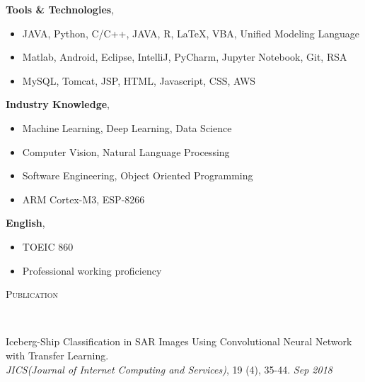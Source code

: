 \documentclass[10pt]{article}
\newenvironment{changemargin}[2]{
  \begin{list}{}{
    \setlength{\topsep}{0pt}
    \setlength{\leftmargin}{#1}
    \setlength{\rightmargin}{#2}
    \setlength{\listparindent}{\parindent}
    \setlength{\itemindent}{\parindent}
    \setlength{\parsep}{\parskip}
  }
  \item[]}{\end{list}
}
\newcommand{\lineover}{
	\begin{changemargin}{-0.05in}{-0.05in}
		\vspace*{-8pt}
		\hrulefill \\
		\vspace*{-2pt}
	\end{changemargin}
}
\newcommand{\header}[1]{
	\begin{changemargin}{-0.5in}{-0.5in}
		\scshape{#1}\\
  	\lineover
	\end{changemargin}
}
\newcommand{\labdescription}[1]{
	\begin{changemargin}{0.15in}{0.15in}
    \smallskip
		{#1}
    \medskip
	\end{changemargin}
}
\newcommand{\labtitle}[3]{
	\textbf{#1}, \emph{#2} \hfill \emph{#3}\\
}
\newcommand{\presentation}[2]{
	{#1} \hfill \emph{#2}\\ \bigskip
}
\newenvironment{body} {
	\vspace*{-16pt}
	\begin{changemargin}{-0.25in}{-0.5in}
  }
	{\end{changemargin}
}
\begin{document}
\begin{body}
	\vspace{14pt}

  	\labtitle{Tools \& Technologies}{}{}
  \labdescription {
  	\begin{itemize} \itemsep -0pt  %
      \item JAVA, Python, C/C++, JAVA, R, LaTeX, VBA, Unified Modeling Language
      \item Matlab, Android, Eclipse, IntelliJ, PyCharm, Jupyter Notebook, Git, RSA
      \item MySQL, Tomcat, JSP, HTML, Javascript, CSS, AWS
  	\end{itemize}
  }
  
  	\labtitle{Industry Knowledge}{}{}
  \labdescription {
  	\begin{itemize} \itemsep -0pt  %
      \item Machine Learning, Deep Learning, Data Science
      \item Computer Vision, Natural Language Processing
      \item Software Engineering, Object Oriented Programming
      \item ARM Cortex-M3, ESP-8266
  	\end{itemize}
  }
  
  	\labtitle{English}{}{}
  \labdescription {
  	\begin{itemize} \itemsep -0pt  %
      \item TOEIC 860
      \item Professional working proficiency
  	\end{itemize}
  }

\end{body}

\medskip


\header{Publication}

\begin{body}
	\vspace{14pt}

\presentation{Iceberg-Ship Classification in SAR Images Using Convolutional Neural Network with Transfer Learning.\\ \emph{JICS(Journal of Internet Computing and Services)}, 19 (4), 35-44.}{Sep 2018}

\end{body}
\end{document}
